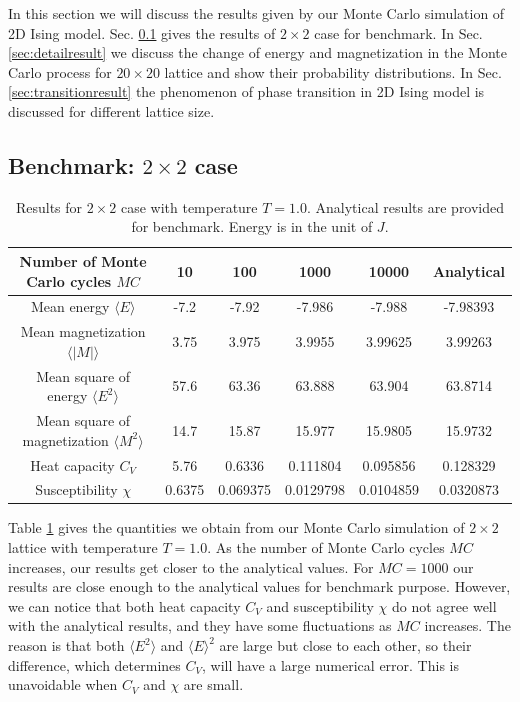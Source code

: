 In this section we will discuss the results given by our Monte Carlo simulation of 2D Ising model. 
Sec. \ref{sec:2times2result} gives the results of $2 \times 2$ case for benchmark. 
In Sec. \ref{sec:detailresult} we discuss the change of energy and magnetization in the Monte Carlo process for $20\times20$ lattice 
and show their probability distributions. 
In Sec. \ref{sec:transitionresult} the phenomenon of phase transition in 2D Ising model is discussed for different lattice size. 

\subsection{Benchmark: $2 \times 2$ case}\label{sec:2times2result}
\begin{table}[tb]
	\centering
	\caption{Results for $2\times2$ case with temperature $T=1.0$. Analytical results are provided for benchmark. 
	Energy is in the unit of $J$. }
	\begin{tabular}{cccccc}
		\hline
		\hline
		Number of Monte Carlo cycles $MC$ & 10 & 100 & 1000 & 10000 & Analytical \\ 
		\hline
		Mean energy $\langle E \rangle$ & -7.2 & -7.92 & -7.986 & -7.988 & -7.98393\\ 
		Mean magnetization $\langle |M| \rangle$ & 3.75 & 3.975 & 3.9955 & 3.99625 & 3.99263\\ 
		Mean square of energy $\langle E^2 \rangle$ & 57.6  & 63.36 & 63.888 & 63.904 & 63.8714\\ 
		Mean square of magnetization $\langle M^2 \rangle$ & 14.7 & 15.87 & 15.977 & 15.9805 & 15.9732\\ 
		Heat capacity $C_V$ & 5.76 & 0.6336 & 0.111804 & 0.095856 & 0.128329\\ 
		Susceptibility $\chi$ & 0.6375 & 0.069375 & 0.0129798 & 0.0104859 & 0.0320873\\ 
		\hline
		\hline 
	\end{tabular} 
	\label{tab:2times2result}
\end{table}
Table \ref{tab:2times2result} gives the quantities we obtain from our Monte Carlo simulation of $2\times2$ lattice with temperature $T=1.0$. 
As the number of Monte Carlo cycles $MC$ increases, our results get closer to the analytical values. 
For $MC=1000$ our results are close enough to the analytical values for benchmark purpose. 
However, we can notice that both heat capacity $C_V$ and susceptibility $\chi$ do not agree well with the analytical results, 
and they have some fluctuations as $MC$ increases. 
The reason is that both $\langle E^2 \rangle$ and $\langle E \rangle^2$ are large but close to each other, 
so their difference, which determines $C_V$, will have a large numerical error. 
This is unavoidable when $C_V$ and $\chi$ are small. 

